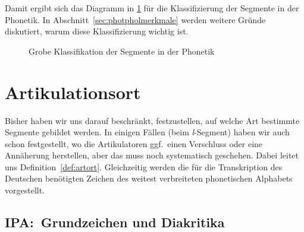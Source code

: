 
Damit ergibt sich das Diagramm in \ref{fig:lautklassen} für die Klassifizierung der Segmente in der Phonetik.
In Abschnitt~\ref{sec:photpholmerkmale} werden weitere Gründe diskutiert, warum diese Klassifizierung wichtig ist.

\begin{figure}
  \centering
  \caption{Grobe Klassifikation der Segmente in der Phonetik}
  \label{fig:lautklassen}
\end{figure}

\section{Artikulationsort}

\label{sec:artort}

Bisher haben wir uns darauf beschränkt, festzustellen, auf welche Art bestimmte Segmente gebildet werden.
In einigen Fällen (\zB beim \textit{l}-Segment) haben wir auch schon festgestellt, wo die Artikulatoren ggf.\ einen Verschluss oder eine Annäherung herstellen, aber das muss noch systematisch geschehen.
Dabei leitet uns Definition~\ref{def:artort}.
Gleichzeitig werden die für die Transkription des Deutschen benötigten Zeichen des weitest verbreiteten phonetischen Alphabets vorgestellt.


\subsection{IPA:\ Grundzeichen und Diakritika}


